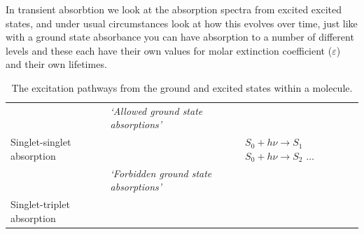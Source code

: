 \documentclass[
]{book}
\begin{document}
In transient absorbtion we look at the absorption spectra from excited excited states, and under usual circumstances look at how this evolves over time, just like with a ground state absorbance you can have absorption to a number of different levels and these each have their own values for molar extinction coefficient (\(\varepsilon\)) and their own lifetimes.

\begin{longtable}[]{@{}lll@{}}
\caption{\label{tab:phototrans} The excitation pathways from the ground and excited states within a molecule.}\tabularnewline
\toprule
\endhead
\begin{minipage}[t]{0.35\columnwidth}\raggedright
\strut
\end{minipage} & \begin{minipage}[t]{0.33\columnwidth}\raggedright
\emph{`Allowed ground state absorptions'}\strut
\end{minipage} & \begin{minipage}[t]{0.23\columnwidth}\raggedright
\strut
\end{minipage}\tabularnewline
\begin{minipage}[t]{0.35\columnwidth}\raggedright
Singlet-singlet absorption\strut
\end{minipage} & \begin{minipage}[t]{0.33\columnwidth}\raggedright
\strut
\end{minipage} & \begin{minipage}[t]{0.23\columnwidth}\raggedright
\(S_0 + h \nu \longrightarrow S_1\) \(S_0 + h \nu \longrightarrow S_2\) \(\dots\)\strut
\end{minipage}\tabularnewline
\begin{minipage}[t]{0.35\columnwidth}\raggedright
\strut
\end{minipage} & \begin{minipage}[t]{0.33\columnwidth}\raggedright
\emph{`Forbidden ground state absorptions'}\strut
\end{minipage} & \begin{minipage}[t]{0.23\columnwidth}\raggedright
\strut
\end{minipage}\tabularnewline
\begin{minipage}[t]{0.35\columnwidth}\raggedright
Singlet-triplet absorption\strut
\end{minipage} & \begin{minipage}[t]{0.33\columnwidth}\raggedright
\strut
\end{minipage} & \begin{minipage}[t]{0.23\columnwidth}\raggedright

\end{minipage}
\end{longtable}
\end{document}
